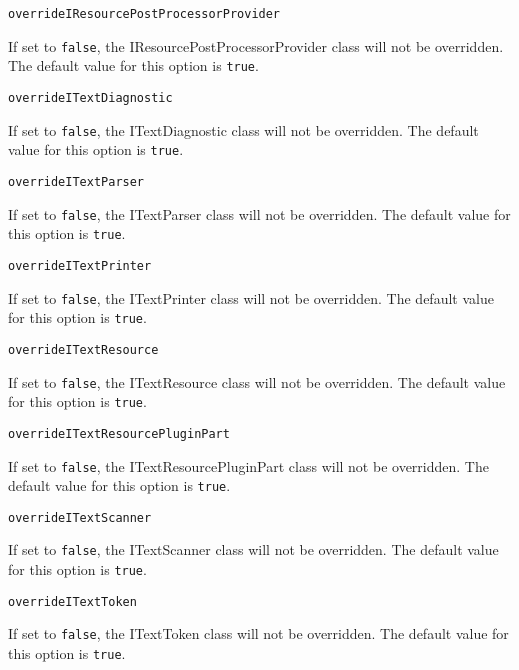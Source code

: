 \noindent\texttt{overrideIResourcePostProcessorProvider}
\begin{myindentpar}{1cm}
If set to \texttt{false}, the IResourcePostProcessorProvider class will not be overridden. The default value for this option is \texttt{true}.
\end{myindentpar}

\noindent\texttt{overrideITextDiagnostic}
\begin{myindentpar}{1cm}
If set to \texttt{false}, the ITextDiagnostic class will not be overridden. The default value for this option is \texttt{true}.
\end{myindentpar}

\noindent\texttt{overrideITextParser}
\begin{myindentpar}{1cm}
If set to \texttt{false}, the ITextParser class will not be overridden. The default value for this option is \texttt{true}.
\end{myindentpar}

\noindent\texttt{overrideITextPrinter}
\begin{myindentpar}{1cm}
If set to \texttt{false}, the ITextPrinter class will not be overridden. The default value for this option is \texttt{true}.
\end{myindentpar}

\noindent\texttt{overrideITextResource}
\begin{myindentpar}{1cm}
If set to \texttt{false}, the ITextResource class will not be overridden. The default value for this option is \texttt{true}.
\end{myindentpar}

\noindent\texttt{overrideITextResourcePluginPart}
\begin{myindentpar}{1cm}
If set to \texttt{false}, the ITextResourcePluginPart class will not be overridden. The default value for this option is \texttt{true}.
\end{myindentpar}

\noindent\texttt{overrideITextScanner}
\begin{myindentpar}{1cm}
If set to \texttt{false}, the ITextScanner class will not be overridden. The default value for this option is \texttt{true}.
\end{myindentpar}

\noindent\texttt{overrideITextToken}
\begin{myindentpar}{1cm}
If set to \texttt{false}, the ITextToken class will not be overridden. The default value for this option is \texttt{true}.
\end{myindentpar}

